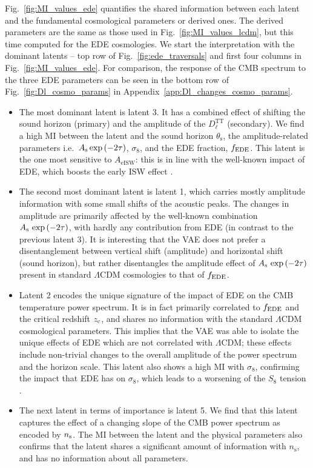\documentclass[aps, prd, reprint, superscriptaddress, nofootinbib, bibnotes]{revtex4-2}
\newcommand{\Dl}{$D_{\ell}^\mathrm{TT}$}
\begin{document}
Fig.~\ref{fig:MI_values_ede} quantifies the shared information between each latent and the fundamental cosmological parameters or derived ones. The derived parameters are the same as those used in Fig.~\ref{fig:MI_values_lcdm}, but this time computed for the EDE cosmologies.
We start the interpretation with the dominant latents -- top row of Fig.~\ref{fig:ede_traversals} and first four columns in Fig.~\ref{fig:MI_values_ede}. For comparison, the response of the CMB spectrum to the three EDE parameters can be seen in the bottom row of Fig.~\ref{fig:Dl_cosmo_params} in Appendix~\ref{app:Dl_changes_cosmo_params}.
%
\begin{itemize}
    \item The most dominant latent is latent 3. It has a combined effect of shifting the sound horizon (primary) and the amplitude of the \Dl{} (secondary). 
    We find a high MI between the latent and the sound horizon $\theta_\mathrm{s}$, the amplitude-related parameters i.e.\ $A_{\rm{s}} \exp{(-2\tau)}$, $\sigma_8$, and the EDE fraction, $f_{\rm{EDE}}$. This latent is the one most sensitive to $A_\mathrm{eISW}$: this is in line with the well-known impact of EDE, which boosts the early ISW effect \cite{Vagnozzi:2021gjh}.
    
    \item The second most dominant latent is latent 1, which carries mostly amplitude information with some small shifts of the acoustic peaks. The changes in amplitude are primarily affected by the well-known combination $A_{\rm{s}}\,\exp{(-2\tau)}$, with hardly any contribution from EDE (in contrast to the previous latent 3). It is interesting that the VAE does not prefer a disentanglement between vertical shift (amplitude) and horizontal shift (sound horizon), but rather disentangles the amplitude effect of $A_{\rm{s}}\,\exp{(-2\tau)}$ present in standard $\Lambda$CDM cosmologies to that of $f_{\rm EDE}$.
    
    \item Latent 2 encodes the unique signature of the impact of EDE on the CMB temperature power spectrum.
    It is in fact primarily correlated to $f_{\rm EDE}$ and the critical redshift $z_{\rm{c}}$, and shares no information with the standard $\Lambda$CDM cosmological parameters. This implies that the VAE was able to isolate the unique effects of EDE which are not correlated with $\Lambda$CDM; these effects include non-trivial changes to the overall amplitude of the power spectrum and the horizon scale. This latent also shows a high MI with $\sigma_8$, confirming the impact that EDE has on $\sigma_8$, which leads to a worsening of the $S_8$ tension \cite{Smith:2019ihp, Hill:2020osr, Ivanov:2020ril, Vagnozzi:2021gjh, Ye:2021nej, Pedreira:2023qqt}. 
    
    
    \item The next latent in terms of importance is latent 5. We find that this latent captures the effect of a changing slope of the CMB power spectrum as encoded by $n_{\rm{s}}$. The MI between the latent and the physical parameters also confirms that the latent shares a significant amount of information with $n_\mathrm{s}$, and has no information about all parameters.
\end{itemize}
\end{document}
